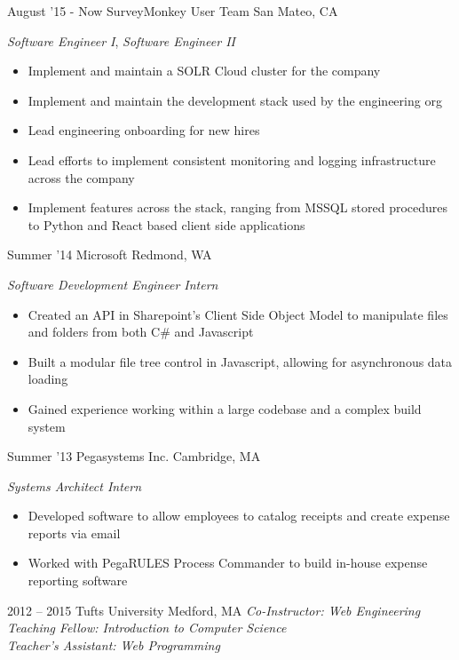 \documentclass[print]{friggeri-cv} %
\begin{document}
\begin{entrylist}
\entry
{August '15 - Now}
{SurveyMonkey User Team}
{San Mateo, CA}
{\emph{Software Engineer I}, \emph{Software Engineer II}
\begin{itemize}
\item Implement and maintain a SOLR Cloud cluster for the company
\item Implement and maintain the development stack used by the engineering org
\item Lead engineering onboarding for new hires
\item Lead efforts to implement consistent monitoring and logging infrastructure across the company
\item Implement features across the stack, ranging from MSSQL stored procedures to Python and React based client side applications
\end{itemize}}
\entry
{Summer '14}
{Microsoft }
{Redmond, WA}
{\emph{Software Development Engineer Intern}
\begin{itemize}
\item Created an API in Sharepoint's Client Side Object Model to manipulate files and folders from both C\# and Javascript 
\item Built a modular file tree control in Javascript, allowing for asynchronous data loading
\item Gained experience working within a large codebase and a complex build system
\end{itemize}}
\entry
{Summer '13}
{Pegasystems Inc. }
{Cambridge, MA}
{\emph{Systems Architect Intern} 
\begin{itemize}
\item Developed software to allow employees to catalog receipts and create expense reports via email
\item Worked with PegaRULES Process Commander to build in-house expense reporting software
\end{itemize}}
\entry
{2012 -- 2015}
{Tufts University}
{Medford, MA}
{\emph{Co-Instructor: Web Engineering \\Teaching Fellow: Introduction  to Computer Science \\ Teacher's Assistant: Web Programming} 
}
\end{entrylist}
\end{document}
